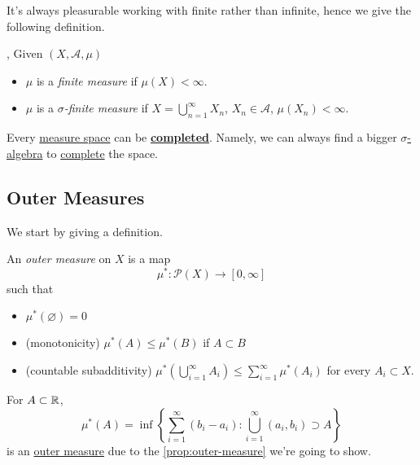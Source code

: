It's always pleasurable working with finite rather than infinite, hence we give the following definition.
\begin{definition}\label{def:finite-measure},
  Given \((X, \mathcal{A} , \mu)\)
  \begin{itemize}
    \item \(\mu\) is a \emph{finite measure} if \(\mu(X)<\infty \).
    \item \(\mu\) is a \emph{\(\sigma\)-finite measure} if \(X = \bigcup\limits_{n=1}^{\infty} X_{n}\), \(X_{n}\in \mathcal{A} \), \(\mu(X_{n})<\infty \).
  \end{itemize}
\end{definition}

\begin{exercise}
  Every \hyperref[def:measurable-space]{measure space} can be \hyperref[def:complete-measure-space]{\textbf{completed}}. Namely, we can always find a bigger \hyperref[def:sigma-algebra]{\(\sigma\)-algebra} to \hyperref[def:complete-measure-space]{complete} the space.
\end{exercise}

\subsection{Outer Measures}\label{ssec:Outer-Measures}
We start by giving a definition.

\begin{definition}\label{def:outer-measure}
  An \emph{outer measure} on \(X\) is a map
  \[
    \mu^{*} \colon \mathcal{P} (X)\to [0, \infty ]
  \]
  such that
  \begin{itemize}
    \item\label{def:outer-measure-empty-measure} \(\mu^{*} (\varnothing ) = 0\)
    \item\label{def:outer-measure-montonicity} (monotonicity) \(\mu^{*} (A)\leq \mu^{*} (B)\) if \(A\subset B\)
    \item\label{def:outer-measure-countable-subadditivity} (countable subadditivity) \(\mu^{*} \left(\bigcup\limits_{i=1}^{\infty} A_{i}\right) \leq \sum\limits_{i=1}^{\infty} \mu^{*} (A_{i})\) for every \(A_{i} \subset X \).
  \end{itemize}
\end{definition}

\begin{eg}
  For \(A\subset\mathbb{\MakeUppercase{R}} \),
  \[
    \mu^{*} (A) = \inf \left\{\sum\limits_{i=1}^{\infty} (b_{i} - a_{i}) \colon \bigcup\limits_{i=1}^{\infty} (a_{i}, b_{i})\supset A\right\}
  \]
  is an \hyperref[def:outer-measure]{outer measure} due to the \autoref{prop:outer-measure} we're going to show.
\end{eg}

